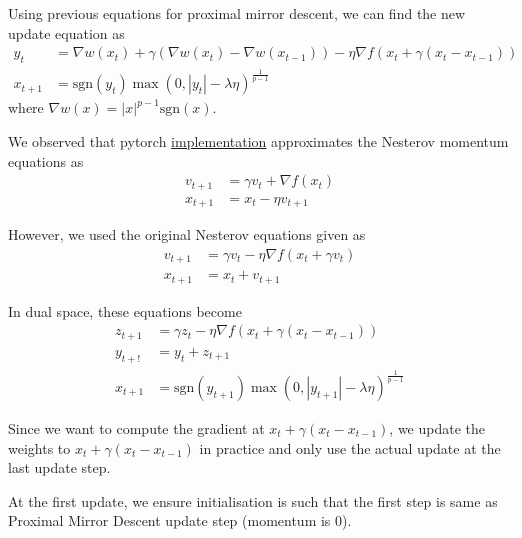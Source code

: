 Using previous equations for proximal mirror descent, we can find the new update equation as 
\begin{align*}
y_t &= \nabla w(x_t) + \gamma (\nabla w(x_t)-\nabla w(x_{t-1})) - \eta \nabla f(x_t+\gamma (x_t-x_{t-1}))\\
x_{t+1} &= \text{sgn}(y_t) \max(0, |y_t| - \lambda \eta)^{\frac{1}{p-1}}
\end{align*}
where $\nabla w(x) = |x|^{p-1} \text{sgn}(x)$.

We observed that pytorch \href{https://pytorch.org/docs/stable/generated/torch.optim.SGD.html}{implementation} approximates the Nesterov momentum equations as 
\begin{align*}
v_{t+1} &= \gamma v_t + \nabla f(x_t)\\
x_{t+1} &= x_t - \eta v_{t+1}
\end{align*}

However, we used the original Nesterov equations given as
\begin{align*}
v_{t+1} &= \gamma v_t - \eta \nabla f(x_t+\gamma v_t)\\
x_{t+1} &= x_t + v_{t+1}
\end{align*}

In dual space, these equations become
\begin{align*}
z_{t+1} &= \gamma z_t - \eta \nabla f(x_t+\gamma (x_t-x_{t-1}))\\
y_{t+!} &= y_t + z_{t+1}\\
x_{t+1} &= \text{sgn}(y_{t+1}) \max(0, |y_{t+1}| - \lambda \eta)^{\frac{1}{p-1}}
\end{align*}

Since we want to compute the gradient at $x_t+\gamma (x_t-x_{t-1})$, we update the weights to $x_t+\gamma (x_t-x_{t-1})$ in practice and only use the actual update at the last update step. 

At the first update, we ensure initialisation is such that the first step is same as Proximal Mirror Descent update step (momentum is 0).